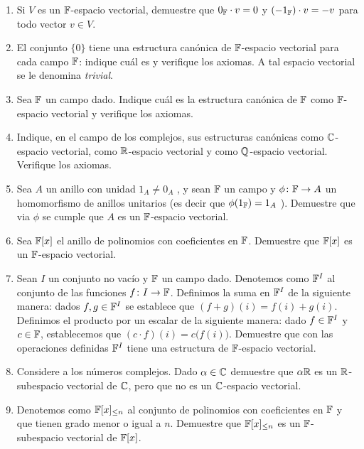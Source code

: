 \ExerciseSection


\begin{enumerate}
  \item Si $V$ es un $\mathbb{F}$-espacio vectorial, demuestre que $0_{\mathbb{F}} \cdot v = 0$ y $(-1_{\mathbb{F}}) \cdot v = -v$ para todo vector $v \in V$.

  \item El conjunto $\{0\}$ tiene una estructura canónica de $\mathbb{F}$-espacio vectorial para cada campo $\mathbb{F}$: indique cuál es y verifique los axiomas. A tal espacio vectorial se le denomina \emph{trivial}.
  
  \item Sea $\mathbb{F}$ un campo dado. Indique cuál es la estructura canónica de $\mathbb{F}$ como $\mathbb{F}$-espacio vectorial y verifique los axiomas.
  
  \item Indique, en el campo de los complejos, sus estructuras canónicas como $\mathbb{C}$-espacio vectorial, como $\mathbb{R}$-espacio vectorial y como $\mathbb{Q}$-espacio vectorial. Verifique los axiomas.
  
  \item Sea $A$ un anillo con unidad $1_A \neq 0_A$ , y sean $\mathbb{F}$ un campo y $\phi\colon \mathbb{F} \to A$ un homomorfismo de anillos unitarios (es decir que $\phi(1_{\mathbb{F}}) = 1_A$ ). Demuestre que via $\phi$ se cumple que $A$ es un $\mathbb{F}$-espacio vectorial.
  
  \item Sea $\mathbb{F}[x]$ el anillo de polinomios con coeficientes en $\mathbb{F}$. Demuestre que $\mathbb{F}[x]$ es un $\mathbb{F}$-espacio vectorial.
  
  \item Sean $I$ un conjunto no vacío y $\mathbb{F}$ un campo dado. Denotemos como $\mathbb{F}^I$ al conjunto de las funciones $f\colon I \to \mathbb{F}$. Definimos la suma en $\mathbb{F}^I$ de la siguiente manera: dados $f, g \in \mathbb{F}^I$ se establece que $(f + g)(i) = f(i) + g(i)$. Definimos el producto por un escalar de la siguiente manera: dado $f \in \mathbb{F}^I$ y $c \in \mathbb{F}$, establecemos que $(c \cdot f )(i) = c \bigl( f(i) \bigr)$. Demuestre que con las operaciones definidas $\mathbb{F}^I$ tiene una estructura de $\mathbb{F}$-espacio vectorial.
  
  \item Considere a los números complejos. Dado $\alpha \in \mathbb{C}$ demuestre que $\alpha \mathbb{R}$ es un $\mathbb{R}$-subespacio vectorial de $\mathbb{C}$, pero que no es un $\mathbb{C}$-espacio vectorial.
  
  \item Denotemos como $\mathbb{F}[x]_{\leq n}$ al conjunto de polinomios con coeficientes en $\mathbb{F}$ y que tienen grado menor o igual a $n$. Demuestre que $\mathbb{F}[x]_{\leq n}$ es un $\mathbb{F}$-subespacio vectorial de $\mathbb{F}[x]$.
  

\end{enumerate}
